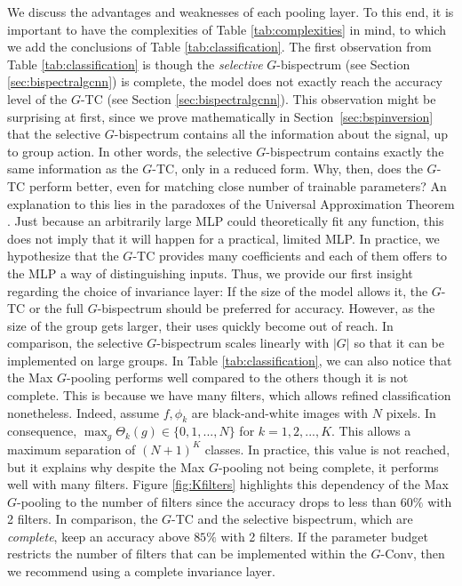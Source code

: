 \documentclass{article}
\theoremstyle{plain}
\theoremstyle{definition}
\theoremstyle{remark}
\begin{document}
We discuss the advantages and weaknesses of each pooling layer. To this end, it is important to have the complexities of Table \ref{tab:complexities} in mind, to which we add the conclusions of Table \ref{tab:classification}. The first observation from Table \ref{tab:classification} is though the \emph{selective} $G$-bispectrum (see Section \ref{sec:bispectralgcnn}) is complete, the model does not exactly reach the accuracy level of the $G$-TC (see Section \ref{sec:bispectralgcnn}). This observation might be surprising at first, since we prove mathematically in Section~\ref{sec:bspinversion} that the selective $G$-bispectrum contains all the information about the signal, up to group action. In other words, the selective $G$-bispectrum contains exactly the same information as the $G$-TC, only in a reduced form. Why, then, does the $G$-TC perform better, even for matching close number of trainable parameters? An explanation to this lies in the paradoxes of the Universal Approximation Theorem \cite{HORNIK1989359}. Just because an arbitrarily large MLP could theoretically fit any function, this does not imply that it will happen for a practical, limited MLP. In practice, we hypothesize that the $G$-TC provides many coefficients and each of them offers to the MLP a way of distinguishing inputs. Thus, we provide our first insight regarding the choice of invariance layer: If the size of the model allows it, the $G$-TC or the full $G$-bispectrum should be preferred for accuracy. However, as the size of the group gets larger, their uses quickly become out of reach. In comparison, the selective $G$-bispectrum scales linearly with $|G|$ so that it can be implemented on large groups.
In Table \ref{tab:classification}, we can also notice that the Max $G$-pooling performs well compared to the others though it is not complete. This is because we have many filters, which allows refined classification nonetheless. Indeed, assume $f,\phi_k$ are black-and-white images with $N$ pixels. In consequence, $\max_g\Theta_k(g)\in\{0,1,...,N\}$ for $k=1,2,...,K$. This allows a maximum separation of $(N+1)^K$ classes. In practice, this value is not reached, but it explains why despite the Max $G$-pooling not being complete, it performs well with many filters. Figure \ref{fig:Kfilters} highlights this dependency of the Max $G$-pooling to the number of filters since the accuracy drops to less than $60\%$ with 2 filters. In comparison, the $G$-TC and the selective bispectrum, which are \emph{complete}, keep an accuracy above $85\%$ with 2 filters. If the parameter budget restricts the number of filters that can be implemented within the $G$-Conv, then we recommend using a complete invariance layer.
\end{document}
